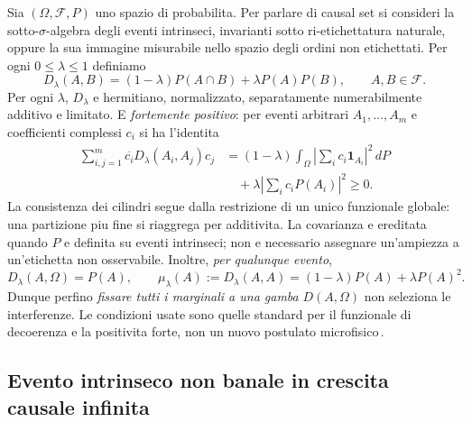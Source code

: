 \documentclass[11pt,a4paper]{article}
\begin{document}
Sia $(\Omega,\mathcal F,P)$ uno spazio di probabilita. Per parlare di causal set si
consideri la sotto-$\sigma$-algebra degli eventi intrinseci, invarianti sotto
ri-etichettatura naturale, oppure la sua immagine misurabile nello spazio degli ordini
non etichettati. Per ogni $0\le\lambda\le1$ definiamo
\begin{equation}
 \boxed{D_\lambda(A,B)=(1-\lambda)P(A\cap B)+\lambda P(A)P(B),\qquad A,B\in\mathcal F.}
 \label{eq:r12aq_functional}
\end{equation}
Per ogni $\lambda$, $D_\lambda$ e hermitiano, normalizzato, separatamente
numerabilmente additivo e limitato. E \emph{fortemente positivo}: per eventi arbitrari
$A_1,\ldots,A_m$ e coefficienti complessi $c_i$ si ha l'identita
\begin{align}
 \sum_{i,j=1}^m\overline{c_i}D_\lambda(A_i,A_j)c_j
 &=(1-\lambda)\int_\Omega\left|\sum_i c_i\mathbf1_{A_i}\right|^2\,dP\nonumber\\
 &\quad+\lambda\left|\sum_i c_iP(A_i)\right|^2\ge0.
 \label{eq:r12aq_strong_pos}
\end{align}
La consistenza dei cilindri segue dalla restrizione di un unico funzionale globale:
una partizione piu fine si riaggrega per additivita. La covarianza e ereditata
quando $P$ e definita su eventi intrinseci; non e necessario assegnare un'ampiezza a
un'etichetta non osservabile. Inoltre,\emph{ per qualunque evento},
\begin{equation}
 D_\lambda(A,\Omega)=P(A),\qquad
 \mu_\lambda(A):=D_\lambda(A,A)=(1-\lambda)P(A)+\lambda P(A)^2.
 \label{eq:r12aq_same_marginal}
\end{equation}
Dunque perfino \emph{fissare tutti i marginali a una gamba} $D(A,\Omega)$ non
seleziona le interferenze. Le condizioni usate sono quelle standard per il
funzionale di decoerenza e la positivita forte, non un nuovo postulato
microfisico\,\cite{RideoutSorkin2000,DowkerWilkes2020}.

\subsection{Evento intrinseco non banale in crescita causale infinita}
\end{document}
